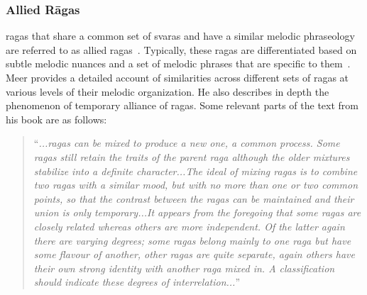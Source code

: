 \subsubsection{Allied R\={a}gas}
\label{sec:allied_ragas}

\Glspl{raga} that share a common set of \glspl{svara} and have a similar melodic phraseology are referred to as allied \glspl{raga}~\citep{krishna2012carnatic}. Typically, these \glspl{raga} are differentiated based on subtle melodic nuances and a set of melodic phrases that are specific to them~\citep[p. 74-76]{meer1980hindustani}. Meer provides a detailed account of similarities across different sets of \glspl{raga} at various levels of their melodic organization. He also describes in depth the phenomenon of temporary alliance of \glspl{raga}. Some relevant parts of the text from his book are as follows: 

\blockquote{``\textit{...\Glspl{raga} can be mixed to produce a new one, a common process. Some \glspl{raga} still retain the traits of the parent \gls{raga} although the older mixtures stabilize into a definite character...The ideal of mixing \glspl{raga} is to combine two \glspl{raga} with a similar mood, but with no more than one or two common points, so that the contrast between the \glspl{raga} can be maintained and their union is only temporary...It appears from the foregoing that some \glspl{raga} are closely related whereas others are more independent. Of the latter again there are varying degrees; some \glspl{raga} belong mainly to one \gls{raga} but have some flavour of another, other \glspl{raga} are quite separate, again others have their own strong identity with another \gls{raga} mixed in. A classification should indicate these degrees of interrelation...}''}






